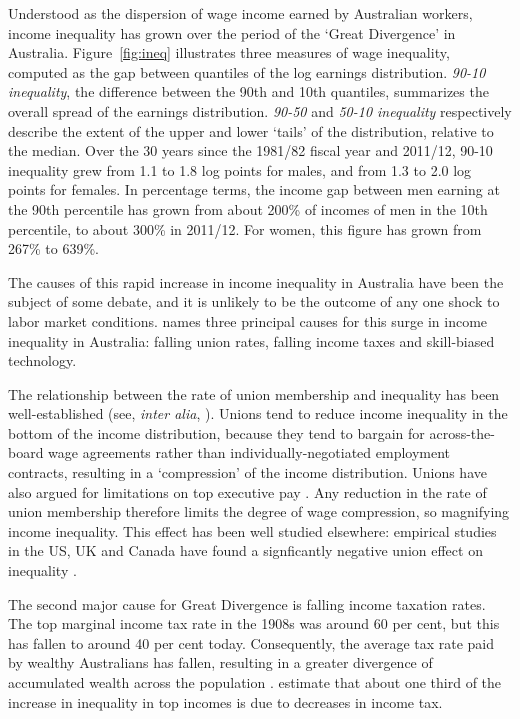 Understood as the dispersion of wage income earned by Australian workers, income inequality has grown over the period of the `Great Divergence' in Australia. Figure~\ref{fig:ineq} illustrates three measures of wage inequality, computed as the gap between quantiles of the log earnings distribution. {\em 90-10 inequality}, the difference between the 90th and 10th quantiles, summarizes the overall spread of the earnings distribution. {\em 90-50} and {\em 50-10 inequality} respectively describe the extent of the upper and lower `tails' of the distribution, relative to the median. Over the 30 years since the 1981/82 fiscal year and 2011/12, 90-10 inequality grew from 1.1 to 1.8 log points for males, and from 1.3 to 2.0 log points for females. In percentage terms, the income gap between men earning at the 90th percentile has grown from about 200\% of incomes of men in the 10th percentile, to about 300\% in 2011/12. For women, this figure has grown from 267\% to 639\%.


The causes of this rapid increase in income inequality in Australia have been the subject of some debate, and it is unlikely to be the outcome of any one shock to labor market conditions. \citet{Leigh2013} names three principal causes for this surge in income inequality in Australia: falling union rates, falling income taxes and skill-biased technology. 

The relationship between the rate of union membership and inequality has been well-established (see, {\em inter alia}, \cite{Borland1996}).  Unions tend to reduce income inequality in the bottom of the income distribution, because they tend to bargain for across-the-board wage agreements rather than individually-negotiated employment contracts, resulting in a `compression' of the income distribution. Unions have also argued for limitations on top executive pay \citep{Davis2009}. Any reduction in the rate of union membership therefore limits the degree of wage compression, so magnifying income inequality. This effect has been well studied elsewhere: empirical studies in the US, UK and Canada have found a signficantly negative union effect on inequality \citet{Card2004,Firpo2009}. 

The second major cause for Great Divergence is falling income taxation rates. The top marginal income tax rate in the 1908s was around 60 per cent, but this has fallen to around 40 per cent today. Consequently, the average tax rate paid by wealthy Australians has fallen, resulting in a greater divergence of accumulated wealth across the population \citet[p31]{Leigh2013}. \citet{Atkinson2013} estimate that about one third of the increase in inequality in top incomes is due to decreases in income tax.

